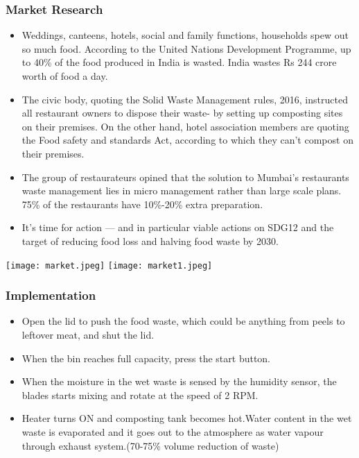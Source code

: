 \documentclass[11pt]{beamer}
\begin{document}
\begin{frame}
\frametitle{Market Research}
\begin{itemize}
	\item Weddings, canteens, hotels, social and family functions, households spew out so much food. According to the United Nations Development Programme, up to 40\% of the food produced in India is wasted. 
	India wastes Rs 244 crore worth of food a day.
	\item The civic body, quoting the Solid Waste Management rules, 2016, instructed all restaurant owners to dispose their waste- by setting up composting sites on their premises. On the other hand, hotel association members are quoting the Food safety and standards Act, according to which they can’t compost on their premises.
\end{itemize}	
\end{frame}
\begin{frame}
	\begin{itemize}
	\item The group of restaurateurs opined that the solution to Mumbai’s restaurants waste management lies in micro management rather than large scale plans. 75\% of the restaurants have 10\%-20\% extra preparation.
	\item It’s time for action — and in particular viable actions on SDG12 and the target of reducing food loss and halving food waste by 2030.
\end{itemize}
\texttt{[image: market.jpeg]}
\texttt{[image: market1.jpeg]}
	\end{frame}
\begin{frame}
\frametitle{Implementation}
\begin{itemize}
\item Open the lid to push the food waste, which could be anything from peels to leftover meat, and shut the lid.\item When the bin reaches full capacity, press the start button.\item When the moisture in the wet waste is sensed by the humidity sensor, the blades starts mixing and rotate at the speed of 2 RPM.\item Heater turns ON and composting tank becomes hot.Water content in the wet waste is evaporated and it goes out to the atmosphere as water vapour through exhaust system.(70-75\% volume reduction of waste)
\end{itemize}
\end{frame}
\end{document}

